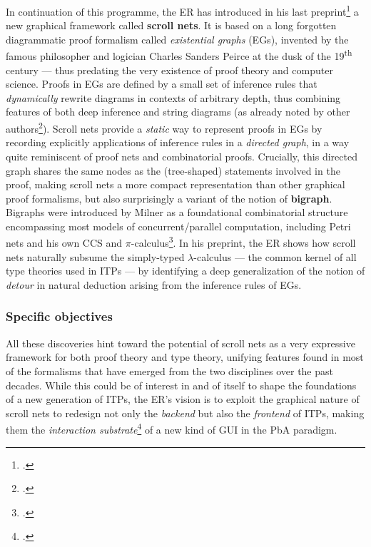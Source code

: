\documentclass[12pt,draftproposal]{msca-pf}
\begin{document}
In continuation of this programme, the ER has introduced in his last
preprint\footcite{donatoScrollNets2025} a new graphical framework called \textbf{scroll nets}. It is
based on a long forgotten diagrammatic proof formalism called \emph{existential graphs} (EGs),
invented by the famous philosopher and logician Charles Sanders Peirce at the dusk of the
19\textsuperscript{th} century --- thus predating the very existence of proof theory and computer
science. Proofs in EGs are defined by a small set of inference rules that \emph{dynamically} rewrite
diagrams in contexts of arbitrary depth, thus combining features of both deep inference and string
diagrams (as already noted by other authors\footcite{bonchi_diagrammatic_2024}). Scroll nets provide
a \emph{static} way to represent proofs in EGs by recording explicitly applications of inference
rules in a \emph{directed graph}, in a way quite reminiscent of proof nets and combinatorial proofs.
Crucially, this directed graph shares the same nodes as the (tree-shaped) statements involved in the
proof, making scroll nets a more compact representation than other graphical proof formalisms, but
also surprisingly a variant of the notion of \textbf{bigraph}. Bigraphs were introduced by Milner as
a foundational combinatorial structure encompassing most models of concurrent/parallel computation,
including Petri nets and his own CCS and
$\pi$-calculus\footcite{milnerBigraphicalReactiveSystems2001}. In his preprint, the ER shows how
scroll nets naturally subsume the simply-typed $\lambda$-calculus --- the common kernel of all type
theories used in ITPs --- by identifying a deep generalization of the notion of \emph{detour} in
natural deduction arising from the inference rules of EGs.

\subsubsection{Specific objectives}

All these discoveries hint toward the potential of scroll nets as a very expressive framework for
both proof theory and type theory, unifying features found in most of the formalisms that have
emerged from the two disciplines over the past decades. While this could be of interest in and of
itself to shape the foundations of a new generation of ITPs, the ER's vision is to exploit the
graphical nature of scroll nets to redesign not only the \emph{backend} but also the \emph{frontend}
of ITPs, making them the \emph{interaction
substrate}\footcite{mackayInteractionSubstratesCombining2025} of a new kind of GUI in the PbA
paradigm.
\end{document}
